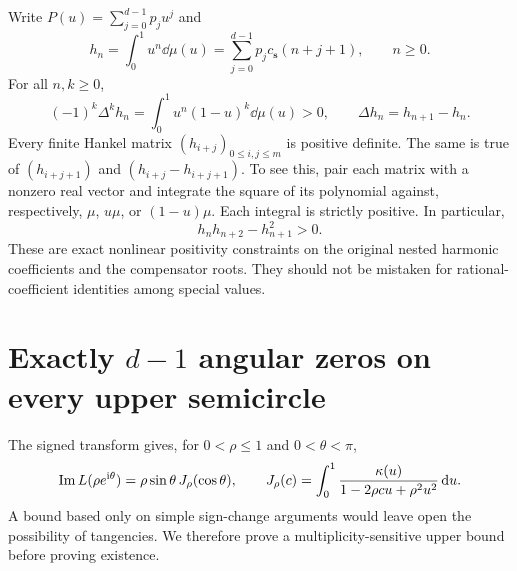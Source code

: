 Write $P(u)=\sum_{j=0}^{d-1}p_ju^j$ and
\begin{equation}\label{ado:eq:compensatedmoments}
 h_n=\int_0^1u^n\dd\mu(u)
     =\sum_{j=0}^{d-1}p_jc_{\boldsymbol{s}}(n+j+1),\qquad n\ge0.
\end{equation}
For all $n,k\ge0$,
\begin{equation}\label{ado:eq:completepositivity}
 (-1)^k\Delta^kh_n
 =\int_0^1u^n(1-u)^k\dd\mu(u)>0,
 \qquad \Delta h_n=h_{n+1}-h_n.
\end{equation}
Every finite Hankel matrix $(h_{i+j})_{0\le i,j\le m}$ is positive
definite. The same is true of $(h_{i+j+1})$ and
$(h_{i+j}-h_{i+j+1})$. To see this, pair each matrix with a nonzero
real vector and integrate the square of its polynomial against,
respectively, $\mu$, $u\mu$, or $(1-u)\mu$. Each integral is strictly
positive. In particular,
\[
 h_nh_{n+2}-h_{n+1}^2>0.
\]
These are exact nonlinear positivity constraints on the original nested
harmonic coefficients and the compensator roots. They should not be
mistaken for rational-coefficient identities among special values.

\section{Exactly \texorpdfstring{$d-1$}{d-1} angular zeros on every upper semicircle}
\label{ado:sec:angular}
The signed transform gives, for $0<\rho\le1$ and $0<\theta<\pi$,
\begin{equation}\label{ado:eq:angulartransform}
 \operatorname{Im} L(\rho e^{\mathrm{i}\theta})
 =\rho\sin\theta\,J_\rho(\cos\theta),\qquad
 J_\rho(c)=\int_0^1
       \frac{\kappa(u)}{1-2\rho cu+\rho^2u^2}\,\mathrm d u.
\end{equation}
A bound based only on simple sign-change arguments would leave open the
possibility of tangencies. We therefore prove a multiplicity-sensitive
upper bound before proving existence.

